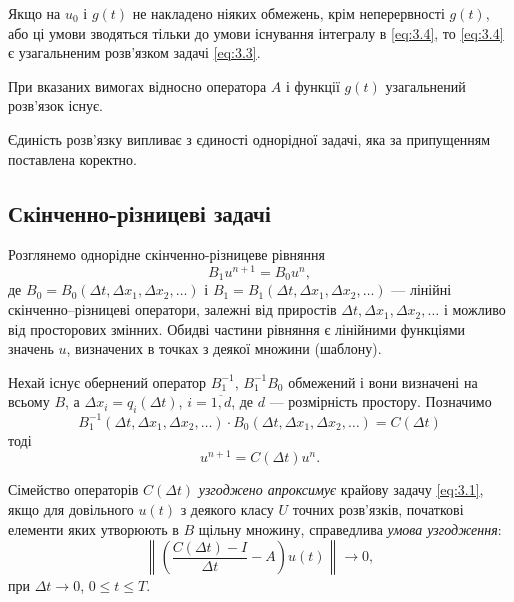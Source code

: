 \begin{proposition}
    Якщо на $u_0$ і $g(t)$  не накладено ніяких обмежень, крім неперервності $g(t)$, або ці умови зводяться тільки до умови існування інтегралу в \eqref{eq:3.4}, то \eqref{eq:3.4} є узагальненим розв'язком задачі \eqref{eq:3.3}.
\end{proposition}

\begin{proposition}
    При вказаних вимогах відносно оператора $A$ і функції $g(t)$ узагальнений розв'язок існує.
\end{proposition}

\begin{remark}
    Єдиність розв'язку випливає з єдиності однорідної задачі, яка за припущенням поставлена коректно. 
\end{remark}

\subsection{Скінченно-різницеві задачі}

Розглянемо однорідне скінченно-різницеве рівняння 
\begin{equation}
    \label{eq:3.4'}
    B_1 u^{n + 1} = B_0 u^n,
\end{equation}
де $B_0 = B_0(\Delta t, \Delta x_1, \Delta x_2, \ldots)$ і $B_1 = B_1(\Delta t, \Delta x_1, \Delta x_2, \ldots)$ --- лінійні скінченно–різницеві оператори, залежні від приростів $\Delta t, \Delta x_1, \Delta x_2, \ldots$ і можливо від просторових змінних. Обидві частини рівняння є лінійними функціями значень $u$, визначених в точках з деякої множини (шаблону). \medskip

Нехай існує обернений оператор $B_1^{-1}$, $B_1^{-1} B_0$ обмежений і вони визначені на всьому $B$, а $\Delta x_i = q_i(\Delta t)$, $i = \overline{1,d}$, де $d$ --- розмірність простору. Позначимо
\begin{equation*}
    B_1^{-1}(\Delta t, \Delta x_1, \Delta x_2, \ldots) \cdot B_0(\Delta t, \Delta x_1, \Delta x_2, \ldots) = C(\Delta t)
\end{equation*}
тоді 
\begin{equation}
    \label{eq:3.5}
    u^{n + 1} = C(\Delta t) u^n.
\end{equation}

\begin{definition}
    Сімейство операторів $C(\Delta t)$ \textit{узгоджено апроксимує} крайову задачу \eqref{eq:3.1}, якщо для довільного $u(t)$ з деякого класу $U$ точних розв'язків, початкові елементи яких утворюють в $B$ щільну множину, справедлива \textit{умова узгодження}:
    \begin{equation}
        \label{eq:3.6a}
        \left\| \left( \frac{C(\Delta t) - I}{\Delta t} - A \right) u(t) \right\| \to 0,
    \end{equation}
    при $\Delta t \to 0$, $0 \le t \le T$.
\end{definition}

